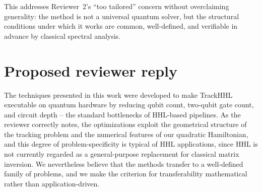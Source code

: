 \documentclass[11pt,a4paper]{article}
\begin{document}
This addresses Reviewer~2's ``too tailored'' concern without overclaiming
generality: the method is not a universal quantum solver, but the
structural conditions under which it works are common, well-defined,
and verifiable in advance by classical spectral analysis.

\section{Proposed reviewer reply}
\label{sec:reply}

\noindent
The techniques presented in this work were developed to make TrackHHL
executable on quantum hardware by reducing qubit count, two-qubit gate
count, and circuit depth -- the standard bottlenecks of HHL-based
pipelines. As the reviewer correctly notes, the optimizations exploit
the geometrical structure of the tracking problem and the numerical
features of our quadratic Hamiltonian, and this degree of
problem-specificity is typical of HHL applications, since HHL is not
currently regarded as a general-purpose replacement for classical
matrix inversion. We nevertheless believe that the methods transfer to
a well-defined family of problems, and we make the criterion for
transferability mathematical rather than application-driven.
\end{document}
